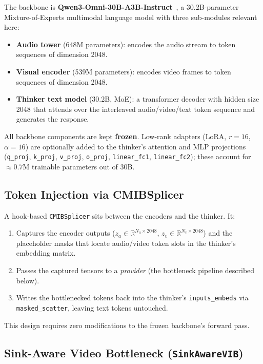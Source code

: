 \documentclass[11pt,a4paper]{article}
\begin{document}
The backbone is \textbf{Qwen3-Omni-30B-A3B-Instruct}~\cite{qwen3omni2025},
a 30.2B-parameter Mixture-of-Experts multimodal language model with three
sub-modules relevant here:
\begin{itemize}
  \item \textbf{Audio tower} (648M parameters): encodes the audio stream to
        token sequences of dimension 2048.
  \item \textbf{Visual encoder} (539M parameters): encodes video frames to
        token sequences of dimension 2048.
  \item \textbf{Thinker text model} (30.2B, MoE): a transformer decoder with
        hidden size 2048 that attends over the interleaved audio/video/text
        token sequence and generates the response.
\end{itemize}
All backbone components are kept \textbf{frozen}.  Low-rank adapters (LoRA,
$r{=}16$, $\alpha{=}16$) are optionally added to the thinker's attention and
MLP projections (\texttt{q\_proj}, \texttt{k\_proj}, \texttt{v\_proj},
\texttt{o\_proj}, \texttt{linear\_fc1}, \texttt{linear\_fc2}); these account
for $\approx 0.7$M trainable parameters out of 30B.

\subsection{Token Injection via CMIBSplicer}

A hook-based \texttt{CMIBSplicer} sits between the encoders and the thinker.
It:
\begin{enumerate}
  \item Captures the encoder outputs ($z_a \in \mathbb{R}^{N_a \times 2048}$,
        $z_v \in \mathbb{R}^{N_v \times 2048}$) and the placeholder masks that
        locate audio/video token slots in the thinker's embedding matrix.
  \item Passes the captured tensors to a \emph{provider} (the bottleneck
        pipeline described below).
  \item Writes the bottlenecked tokens back into the thinker's
        \texttt{inputs\_embeds} via \texttt{masked\_scatter}, leaving text
        tokens untouched.
\end{enumerate}
This design requires zero modifications to the frozen backbone's forward pass.

\subsection{Sink-Aware Video Bottleneck (\texttt{SinkAwareVIB})}
\end{document}
